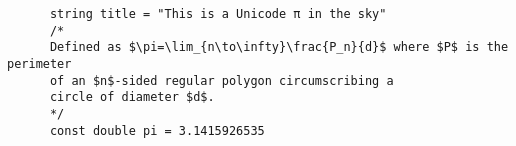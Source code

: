 \documentclass{article}
\begin{document}
    \begin{verbatim}
      string title = "This is a Unicode π in the sky"
      /*
      Defined as $\pi=\lim_{n\to\infty}\frac{P_n}{d}$ where $P$ is the perimeter
      of an $n$-sided regular polygon circumscribing a
      circle of diameter $d$.
      */
      const double pi = 3.1415926535
    \end{verbatim}
\end{document}
